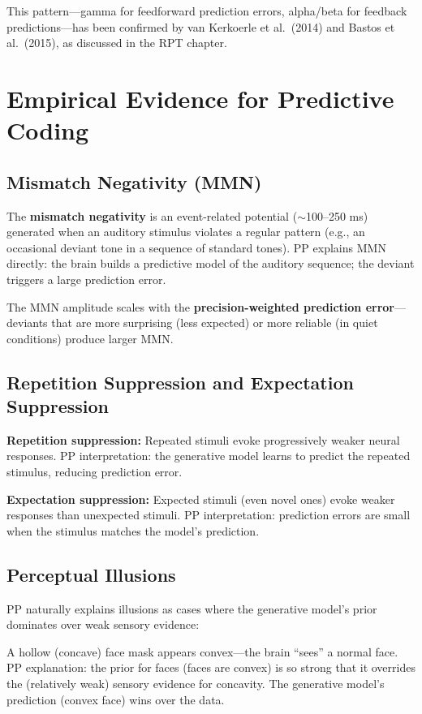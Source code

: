 \documentclass[11pt,a4paper]{report}
\begin{document}
This pattern---gamma for feedforward prediction errors, alpha/beta for feedback predictions---has been confirmed by van Kerkoerle et al.\ (2014) and Bastos et al.\ (2015), as discussed in the RPT chapter.

\section{Empirical Evidence for Predictive Coding}

\subsection{Mismatch Negativity (MMN)}

The \textbf{mismatch negativity} is an event-related potential ($\sim$100--250 ms) generated when an auditory stimulus violates a regular pattern (e.g., an occasional deviant tone in a sequence of standard tones). PP explains MMN directly: the brain builds a predictive model of the auditory sequence; the deviant triggers a large prediction error.

The MMN amplitude scales with the \textbf{precision-weighted prediction error}---deviants that are more surprising (less expected) or more reliable (in quiet conditions) produce larger MMN.

\subsection{Repetition Suppression and Expectation Suppression}

\textbf{Repetition suppression:} Repeated stimuli evoke progressively weaker neural responses. PP interpretation: the generative model learns to predict the repeated stimulus, reducing prediction error.

\textbf{Expectation suppression:} Expected stimuli (even novel ones) evoke weaker responses than unexpected stimuli. PP interpretation: prediction errors are small when the stimulus matches the model's prediction.

\subsection{Perceptual Illusions}

PP naturally explains illusions as cases where the generative model's prior dominates over weak sensory evidence:

\begin{examplebox}
A hollow (concave) face mask appears convex---the brain ``sees'' a normal face. PP explanation: the prior for faces (faces are convex) is so strong that it overrides the (relatively weak) sensory evidence for concavity. The generative model's prediction (convex face) wins over the data.
\end{examplebox}
\end{document}
